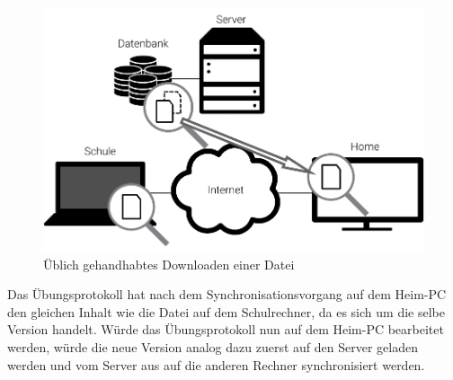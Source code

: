 \begin{figure}[htb]
	\centering
  \includegraphics[]{images/dropbox_download}
  \caption{Üblich gehandhabtes Downloaden einer Datei}
	\label{dropbox_download}
\end{figure}

Das Übungsprotokoll hat nach dem Synchronisationsvorgang auf dem Heim-PC
den gleichen Inhalt wie die Datei auf dem Schulrechner, da es sich um die selbe Version
handelt. Würde das Übungsprotokoll nun auf dem Heim-PC bearbeitet werden, würde
die neue Version analog dazu zuerst auf den Server geladen werden und vom Server
aus auf die anderen Rechner synchronisiert werden.
